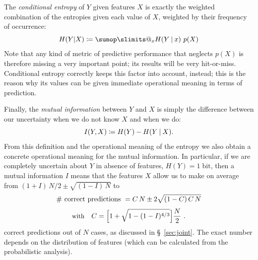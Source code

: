 \documentclass[\ifafour a4paper,12pt,\else a5paper,10pt,\fi%
onecolumn,oneside,article,%
british%
]{memoir}
\makeatletter
\theoremstyle{remark}
\theoremstyle{innote}
\def\sum{\DOTSI\sumop\slimits@}
\newcommand*{\de}{\partialup}%
\newcommand*{\defd}{\coloneqq}
\newcommand*{\p}{\mathrm{p}}%
\renewcommand*{\|}[1][]{\nonscript\:#1\vert\nonscript\:\mathopen{}}
\newcommand*{\sect}{\S}%
\newcommand*{\tsum}{\mathop{\textstyle\sum}\nolimits}
\newcommand*{\bit}{\textrm{bit}}
\makeatother
\begin{document}
The \emph{conditional entropy} of $Y$ given features $X$ is exactly the
weighted combination of the entropies given each value of $X$, weighted by
their frequency of occurrence:
\begin{equation}
  \label{eq:cond_entr}
  H(Y|X) \defd \sum_{x} H(Y\|x)\ p(X)
\end{equation}
Note that any kind of metric of predictive performance that neglects $p(X)$
is therefore missing a very important point; its results will be very
hit-or-miss. Conditional entropy correctly keeps this factor into account,
instead; this is the reason why its values can be given immediate
operational meaning in terms of prediction.


Finally, the \emph{mutual information}  between $Y$ and $X$ is simply the
difference between our uncertainty when we do not know $X$ and when we do:
\begin{equation}
  \label{eq:mutualinfo}
  I(Y,X) \defd H(Y) - H(Y\|X).
\end{equation}
From this definition and the operational meaning of the entropy we also
obtain a concrete operational meaning for the mutual information. In
particular, if we are completely uncertain about $Y$ in absence of
features, $H(Y)=1\;\bit$, then a mutual information $I$ means that the
features $X$ allow us to make on average from $(1+I)\,N/2 \pm
\sqrt{(1-I)\,N}$ to
\begin{equation}
  \label{eq:entropy_est}
  \begin{gathered}
    \text{\# correct predictions } = C\,N \pm 2\sqrt{(1-C)\,C\,N}
    \\[1\jot]
    \text{\small with}\quad C = \Bigl[1+\sqrt{1-(1-I)^{4/3}}\Bigr]\frac{N}{2} \ .
\end{gathered}
\end{equation}
correct predictions out of $N$ cases, as discussed in
\sect~\ref{sec:joint}. The exact number depends on the distribution of
features (which can be calculated from the probabilistic analysis).




\end{document}
